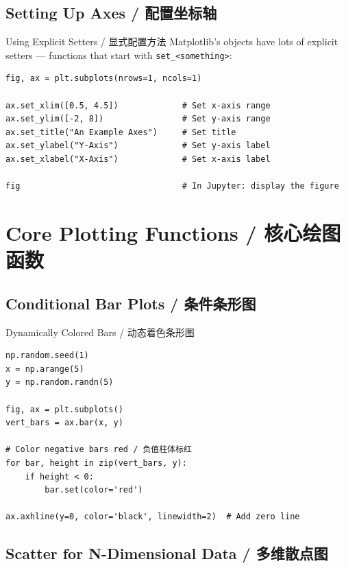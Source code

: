 \documentclass[11pt,a4paper]{article}
\begin{document}
\subsection{Setting Up Axes / 配置坐标轴}

\begin{examplebox}{Using Explicit Setters / 显式配置方法}
    Matplotlib's objects have lots of explicit setters — functions that start with \texttt{set\_<something>}:
\begin{lstlisting}
fig, ax = plt.subplots(nrows=1, ncols=1)

ax.set_xlim([0.5, 4.5])             # Set x-axis range
ax.set_ylim([-2, 8])                # Set y-axis range
ax.set_title("An Example Axes")     # Set title
ax.set_ylabel("Y-Axis")             # Set y-axis label
ax.set_xlabel("X-Axis")             # Set x-axis label

fig                                 # In Jupyter: display the figure
\end{lstlisting}
\end{examplebox}

\section{Core Plotting Functions / 核心绘图函数}

\subsection{Conditional Bar Plots / 条件条形图}

\begin{examplebox}{Dynamically Colored Bars / 动态着色条形图}
\begin{lstlisting}
np.random.seed(1)
x = np.arange(5)
y = np.random.randn(5)

fig, ax = plt.subplots()
vert_bars = ax.bar(x, y)

# Color negative bars red / 负值柱体标红
for bar, height in zip(vert_bars, y):
    if height < 0:
        bar.set(color='red')

ax.axhline(y=0, color='black', linewidth=2)  # Add zero line
\end{lstlisting}
\end{examplebox}

\subsection{Scatter for N-Dimensional Data / 多维散点图}
\end{document}
